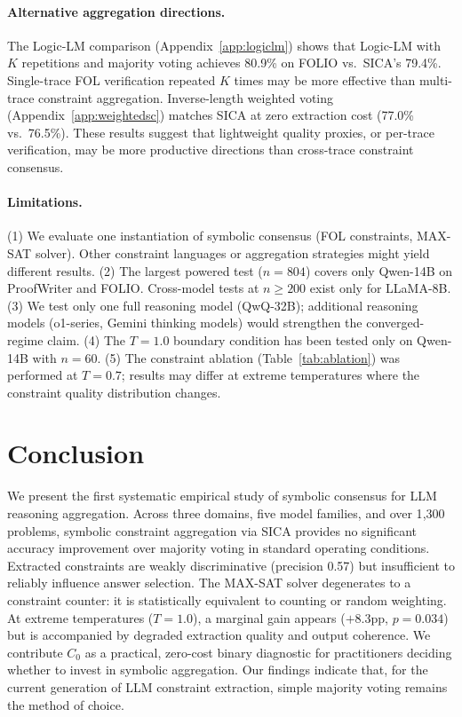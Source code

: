 \documentclass[11pt]{article}
\begin{document}
\paragraph{Alternative aggregation directions.}
The Logic-LM comparison (Appendix~\ref{app:logiclm}) shows that Logic-LM with $K$ repetitions and majority voting achieves 80.9\% on FOLIO vs.\ SICA's 79.4\%.
Single-trace FOL verification repeated $K$ times may be more effective than multi-trace constraint aggregation.
Inverse-length weighted voting (Appendix~\ref{app:weightedsc}) matches SICA at zero extraction cost (77.0\% vs.\ 76.5\%).
These results suggest that lightweight quality proxies, or per-trace verification, may be more productive directions than cross-trace constraint consensus.

\paragraph{Limitations.}
(1) We evaluate one instantiation of symbolic consensus (FOL constraints, MAX-SAT solver). Other constraint languages or aggregation strategies might yield different results.
(2) The largest powered test ($n{=}804$) covers only Qwen-14B on ProofWriter and FOLIO. Cross-model tests at $n{\geq}200$ exist only for LLaMA-8B.
(3) We test only one full reasoning model (QwQ-32B); additional reasoning models (o1-series, Gemini thinking models) would strengthen the converged-regime claim.
(4) The $T{=}1.0$ boundary condition has been tested only on Qwen-14B with $n{=}60$.
(5) The constraint ablation (Table~\ref{tab:ablation}) was performed at $T{=}0.7$; results may differ at extreme temperatures where the constraint quality distribution changes.

\section{Conclusion}

We present the first systematic empirical study of symbolic consensus for LLM reasoning aggregation.
Across three domains, five model families, and over 1{,}300 problems, symbolic constraint aggregation via SICA provides no significant accuracy improvement over majority voting in standard operating conditions.
Extracted constraints are weakly discriminative (precision 0.57) but insufficient to reliably influence answer selection.
The MAX-SAT solver degenerates to a constraint counter: it is statistically equivalent to counting or random weighting.
At extreme temperatures ($T{=}1.0$), a marginal gain appears ($+8.3$pp, $p{=}0.034$) but is accompanied by degraded extraction quality and output coherence.
We contribute $C_0$ as a practical, zero-cost binary diagnostic for practitioners deciding whether to invest in symbolic aggregation.
Our findings indicate that, for the current generation of LLM constraint extraction, simple majority voting remains the method of choice.
\end{document}
